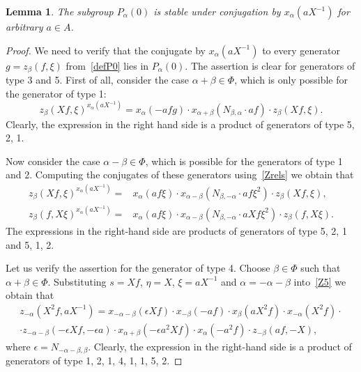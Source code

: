 \documentclass[oneside, 8pt]{amsart}
\newtheorem{lemma}{Lemma}
\theoremstyle{remark}
\theoremstyle{definition}
\numberwithin{lemma}{section}
\numberwithin{prop}{section}
\numberwithin{corollary}{section}
\numberwithin{externaltheorem}{section}
\numberwithin{equation}{section}
\begin{document}
\begin{lemma}\label{P0_conj} The subgroup $P_\alpha(0)$ is stable under conjugation by $x_\alpha(aX^{-1})$ for arbitrary $a\in A$. \end{lemma}
\begin{proof} We need to verify that the conjugate by $x_\alpha(aX^{-1})$ to every generator $g = z_\beta(f, \xi)$ from~\cref{defP0} lies in $P_\alpha(0)$. 
The assertion is clear for generators of type 3 and 5.
First of all, consider the case $\alpha + \beta \in \Phi$, which is only possible for the generator of type 1:
\begin{equation}\label{eq:Zconj1} z_{\beta}(Xf, \xi) ^ {x_{\alpha}(aX^{-1})} = x_{\alpha} (- afg) \cdot x_{\alpha+\beta} (N_{\beta, \alpha}\cdot af) \cdot z_{\beta}(Xf, \xi). \end{equation}
Clearly, the expression in the right hand side is a product of generators of type 5, 2, 1. 

Now consider the case $\alpha - \beta \in \Phi$, which is possible for the generators of type 1 and 2.
Computing the conjugates of these generators using~\cref{Zrels} we obtain that
\begin{align} z_{\beta}(Xf, \xi) ^ {x_{\alpha}(aX^{-1})} = &  x_{\alpha} (af\xi) \cdot x_{\alpha-\beta} (N_{\beta,-\alpha}\cdot af\xi^2) \cdot z_{\beta}(Xf, \xi), \label{eq:Zconj2} \\
z_{\beta}(f, X\xi) ^ {x_{\alpha}(aX^{-1})} = & x_{\alpha} (af\xi) \cdot x_{\alpha-\beta} (N_{\beta,-\alpha}\cdot aXf\xi^2) \cdot z_{\beta}(f, X\xi). \nonumber \end{align}
The expressions in the right-hand side are products of generators of type 5, 2, 1 and 5, 1, 2.

Let us verify the assertion for the generator of type 4.
Choose $\beta\in \Phi$ such that $\alpha+\beta \in \Phi$. 
Substituting $s = Xf$, $\eta = X$, $\xi = aX^{-1}$ and $\alpha = -\alpha - \beta$ into~\eqref{Z5} we obtain that
\begin{multline} \label{eq:Zconj3} z_{-\alpha}(X^2f, aX^{-1}) = x_{-\alpha-\beta}(\epsilon Xf) \cdot x_{-\beta}(-af) \cdot x_{\beta}(aX^2 f) \cdot x_{-\alpha}(X^2f) \cdot \\
 \cdot z_{-\alpha-\beta}(-\epsilon Xf, -\epsilon a) \cdot x_{\alpha+\beta}(-\epsilon a^2 Xf) \cdot x_{\alpha}(- a^2 f) \cdot z_{-\beta}(a f, -X), \end{multline}
where $\epsilon = N_{-\alpha-\beta,\beta}$. 
Clearly, the expression in the right-hand side is a product of generators of type 1, 2, 1, 4, 1, 1, 5, 2. \end{proof}
\end{document}
